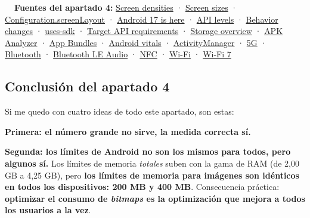 \begin{fuentesbox}
\textbf{\color{muted}\faBook\ \ Fuentes del apartado 4:}
\href{https://developer.android.com/training/multiscreen/screendensities}{Screen densities} ·
\href{https://developer.android.com/training/multiscreen/screensizes}{Screen sizes} ·
\href{https://developer.android.com/reference/android/content/res/Configuration}{Configuration.screenLayout} ·
\href{https://developer.android.com/blog/posts/android-17-is-here}{Android 17 is here} ·
\href{https://developer.android.com/tools/releases/platforms}{API levels} ·
\href{https://developer.android.com/about/versions/17/behavior-changes-all}{Behavior changes} ·
\href{https://developer.android.com/guide/topics/manifest/uses-sdk-element}{uses-sdk} ·
\href{https://support.google.com/googleplay/android-developer/answer/11926878}{Target API requirements} ·
\href{https://developer.android.com/training/data-storage}{Storage overview} ·
\href{https://developer.android.com/studio/debug/apk-analyzer}{APK Analyzer} ·
\href{https://developer.android.com/guide/app-bundle/dynamic-delivery}{App Bundles} ·
\href{https://developer.android.com/topic/performance/vitals}{Android vitals} ·
\href{https://developer.android.com/reference/android/app/ActivityManager}{ActivityManager} ·
\href{https://developer.android.com/develop/connectivity/5g}{5G} ·
\href{https://developer.android.com/develop/connectivity/bluetooth}{Bluetooth} ·
\href{https://developer.android.com/develop/connectivity/bluetooth/ble-audio/overview}{Bluetooth LE Audio} ·
\href{https://developer.android.com/develop/connectivity/nfc}{NFC} ·
\href{https://developer.android.com/develop/connectivity/wifi}{Wi-Fi} ·
\href{https://source.android.com/docs/core/connect/wifi-7}{Wi-Fi 7}
\end{fuentesbox}

\subsection{Conclusión del apartado 4}

Si me quedo con cuatro ideas de todo este apartado, son estas:

\textbf{Primera: el número grande no sirve, la medida correcta sí.}

\textbf{Segunda: los límites de Android no son los mismos para todos, pero algunos sí.} Los límites de memoria \emph{totales} suben con la gama de RAM (de 2,00 GB a 4,25 GB), pero \textbf{los límites de memoria para imágenes son idénticos en todos los dispositivos: 200 MB y 400 MB}. Consecuencia práctica: \textbf{optimizar el consumo de \emph{bitmaps} es la optimización que mejora a todos los usuarios a la vez}.

